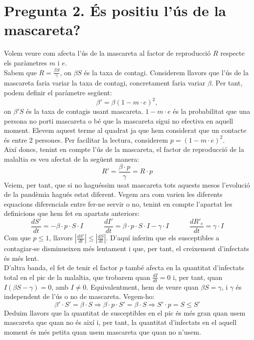 \documentclass[a4paper, 11pt]{article}
\begin{document}
\section{Pregunta 2. És positiu l'ús de la mascareta?}
  Volem veure com afecta l'ús de la mascareta al factor de reproducció $R$ respecte els paràmetres $m$ i $e$.\\
  Sabem que $R = \frac{\beta S}{\gamma}$, on $\beta S$ és la taxa de contagi. Considerem llavors que l'ús de la mascareta faria variar la taxa de contagi, concretament faria variar $\beta$. Per tant, podem definir el paràmetre següent:
  \begin{equation}
    \beta ' = \beta \left( 1 - m \cdot e \right)^2,
  \end{equation}
  on $\beta ' S$ és la taxa de contagis usant mascareta. $1 - m \cdot e$ és la probabilitat que una persona no porti mascareta o bé que la mascareta sigui no efectiva en aquell moment. Elevem aquest terme al quadrat ja que hem considerat que un contacte és entre 2 persones. Per facilitar la lectura, considerem $p = \left( 1 - m \cdot e \right)^2$.\\
  Així doncs, tenint en compte l'ús de la mascareta, el factor de reproducció de la malaltia es veu afectat de la següent manera:
  \begin{equation}
    R' = \frac{\beta \cdot p}{\gamma} = R \cdot p
  \end{equation}
  Veiem, per tant, que si no haguéssim usat mascareta tots aquests mesos l'evolució de la pandèmia hagués estat diferent. Vegem ara com varien les diferents equacions diferencials entre fer-ne servir o no, tenint en compte l'apartat les definicions que hem fet en apartats anteriors:
  \begin{equation}
    \frac{dS'}{dt} = - \beta \cdot p \cdot S \cdot I \quad \quad \quad \frac{dI'}{dt} = \beta \cdot p \cdot S \cdot I - \gamma \cdot I \quad \quad \quad \frac{dR'_e}{dt} = \gamma \cdot I
  \end{equation}
  Com que $p \leq 1$, llavors $\left| \frac{dS'}{dt} \right| \leq \left| \frac{dS}{dt} \right|$. D'aquí inferim que els susceptibles a contagiar-se disminueixen més lentament i que, per tant, el creixement d'infectats és més lent.\\
  D'altra banda, el fet de tenir el factor $p$ també afecta en la quantitat d'infectats total en el pic de la malaltia, que trobarem quan $\frac{dI}{dt} = 0$ i, per tant, quan $I \left( \beta S - \gamma \right) = 0$, amb $I \neq 0$. Equivalentment, hem de veure quan $\beta S = \gamma$, i $\gamma$ és independent de l'ús o no de mascareta. Vegem-ho:
  \begin{equation}
    \beta' \cdot S' = \beta \cdot S \Longrightarrow \beta \cdot p \cdot S' = \beta \cdot S \Longrightarrow S' \cdot p = S \leq S'
  \end{equation}
  Deduim llavors que la quantitat de susceptibles en el pic és més gran quan usem mascareta que quan no és així i, per tant, la quantitat d'infectats en el aquell moment és més petita quan usem mascareta que quan no n'usem.
\end{document}
